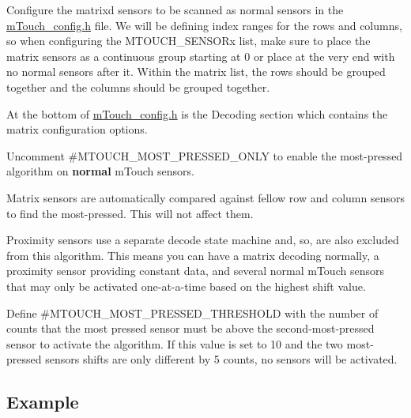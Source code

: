 \begin{DoxyEnumerate}
\item Configure the matrix\textquotesingle{}d sensors to be scanned as normal sensors in the \hyperlink{m_touch__config_8h}{m\+Touch\+\_\+config.\+h} file. We will be defining index ranges for the rows and columns, so when configuring the M\+T\+O\+U\+C\+H\+\_\+\+S\+E\+N\+S\+O\+Rx list, make sure to place the matrix sensors as a continuous group starting at 0 or place at the very end with no \textquotesingle{}normal\textquotesingle{} sensors after it. Within the matrix list, the rows should be grouped together and the columns should be grouped together. 
\item At the bottom of \hyperlink{m_touch__config_8h}{m\+Touch\+\_\+config.\+h} is the \textquotesingle{}Decoding\textquotesingle{} section which contains the matrix configuration options. 
\begin{DoxyEnumerate}
\item Uncomment \#\+M\+T\+O\+U\+C\+H\+\_\+\+M\+O\+S\+T\+\_\+\+P\+R\+E\+S\+S\+E\+D\+\_\+\+O\+N\+L\+Y to enable the most-\/pressed algorithm on {\bfseries normal} m\+Touch sensors. 
\begin{DoxyItemize}
\item Matrix sensors are automatically compared against fellow row and column sensors to find the most-\/pressed. This will not affect them. 
\item Proximity sensors use a separate decode state machine and, so, are also excluded from this algorithm. This means you can have a matrix decoding normally, a proximity sensor providing constant data, and several \textquotesingle{}normal\textquotesingle{} m\+Touch sensors that may only be activated one-\/at-\/a-\/time based on the highest shift value. 
\end{DoxyItemize}
\item Define \#\+M\+T\+O\+U\+C\+H\+\_\+\+M\+O\+S\+T\+\_\+\+P\+R\+E\+S\+S\+E\+D\+\_\+\+T\+H\+R\+E\+S\+H\+O\+L\+D with the number of counts that the most pressed sensor must be above the second-\/most-\/pressed sensor to activate the algorithm. If this value is set to 10 and the two most-\/pressed sensors shifts are only different by 5 counts, no sensors will be activated. 
\end{DoxyEnumerate}
\end{DoxyEnumerate}\hypertarget{feat_most_pressed_featMostPressed-Ex}{}\subsection{Example}\label{feat_most_pressed_featMostPressed-Ex}

